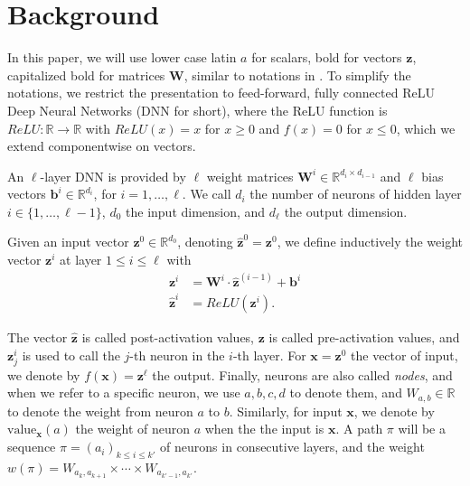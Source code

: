 \documentclass{llncs}
\newcommand{\vz}{\boldsymbol{z}}
\newcommand{\val}{{\textrm{value}}}
\begin{document}
\section{Background}

In this paper, we will use lower case latin $a$ for scalars, bold for vectors $\boldsymbol{z}$, 
capitalized bold for matrices $\boldsymbol{W}$, similar to notations in \cite{prima,crown}.
To simplify the notations, we restrict the presentation to feed-forward, 
fully connected ReLU Deep Neural Networks (DNN for short), where the ReLU function is $ReLU : \mathbb{R} \rightarrow \mathbb{R}$ with
$ReLU(x)=x$ for $x \geq 0$ and $f(x)=0$ for $x \leq 0$, which we extend componentwise on vectors.




An $\ell$-layer DNN is provided by $\ell$ weight matrices 
$\boldsymbol{W}^i \in \mathbb{R}^{d_i\times d_{i-1}}$
and $\ell$ bias vectors $\boldsymbol{b}^i \in \mathbb{R}^{d_i}$, for $i=1, \ldots, \ell$.
We call $d_i$ the number of neurons of hidden layer $i \in \{1, \ldots, \ell-1\}$,
$d_0$ the input dimension, and $d_\ell$ the output dimension.

Given an input vector $\boldsymbol{z}^0 \in \mathbb{R}^{d_0}$, 
denoting $\hat{\boldsymbol{z}}^{0}={\boldsymbol{z}}^0$, we define inductively the weight vector $\boldsymbol{z}^i$ at layer $1 \leq i \leq \ell$ with
\begin{align*}
	{\boldsymbol{z}}^{i} &= \boldsymbol{W}^i\cdot \hat{\boldsymbol{z}}^{(i-1)}+ \boldsymbol{b}^i\\
	\hat{\boldsymbol{z}}^{i} &= ReLU({\boldsymbol{z}}^i).
\end{align*} 

The vector $\hat{\boldsymbol{z}}$ is called post-activation values, 
$\boldsymbol{z}$ is called pre-activation values, 
and $\boldsymbol{z}^{i}_j$ is used to call the $j$-th neuron in the $i$-th layer. 
For $\boldsymbol{x}=\vz^0$ the vector of input, we denote by $f(\boldsymbol{x})=\vz^\ell$ the output. Finally, neurons are also called \emph{nodes}, and when we refer to a specific neuron, we use $a,b,c,d$ to denote them, and $W_{a,b} \in \mathbb{R}$ to denote the weight from neuron $a$ to $b$. Similarly, for input $\boldsymbol{x}$, we denote by $\val_{\boldsymbol{x}}(a)$ the weight of neuron $a$ when the the input is $\boldsymbol{x}$. A path $\pi$ will be a sequence 
$\pi=(a_i)_{k \leq  i \leq k'}$ of neurons in consecutive layers, and the weight $w(\pi)=W_{a_k,a_{k+1}} \times \cdots \times  W_{a_{k'-1},a_{k'}}$.
\end{document}
